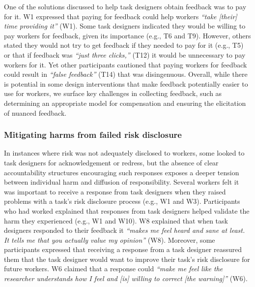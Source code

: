 One of the solutions discussed to help task designers obtain feedback was to pay for it. W1 expressed that paying for feedback could help workers \textit{``take [their] time providing it''} (W1). Some task designers indicated they would be willing to pay workers for feedback, given its importance (e.g., T6 and T9). However, others stated they would not try to get feedback if they needed to pay for it (e.g., T5) or that if feedback was \textit{``just three clicks,''} (T12) it would be unnecessary to pay workers for it. Yet other participants cautioned that paying workers for feedback could result in \textit{``false feedback''} (T14) that was disingenuous. Overall, while there is potential in some design interventions that make feedback potentially easier to use for workers, we surface key challenges in collecting feedback, such as determining an appropriate model for compensation and ensuring the elicitation of nuanced feedback. 


\subsubsection{Mitigating harms from failed risk disclosure}
In instances where risk was not adequately disclosed to workers, some looked to task designers for acknowledgement or redress, but the absence of clear accountability structures encouraging such responses exposes a deeper tension between individual harm and diffusion of responsibility. Several workers felt it was important to receive a response from task designers when they raised problems with a task's  risk disclosure process (e.g., W1 and W3). Participants who had worked explained that responses from task designers helped validate the harm they experienced (e.g., W1 and W10). W8 explained that when task designers responded to their feedback it \textit{``makes me feel heard and sane at least. It tells me that you actually value my opinion''} (W8). Moreover, some participants expressed that receiving a response from a task designer reassured them that the task designer would want to improve their task's risk disclosure for future workers. W6 claimed that a response could \textit{``make me feel like the researcher understands how I feel and [is] willing to correct [the warning]''} (W6). 

